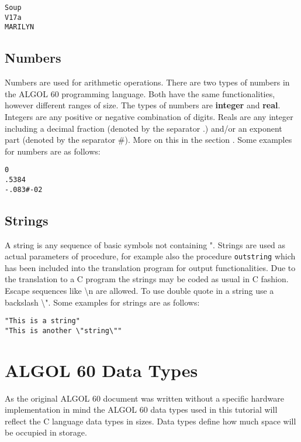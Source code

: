 \documentclass{article}
\begin{document}
\begin{lstlisting}[language={[60]algol}]
Soup
V17a
MARILYN
\end{lstlisting}

\subsection{Numbers} \label{numbers}
Numbers are used for arithmetic operations. There are two types of numbers in the ALGOL 60 programming language. Both have the same functionalities, however different ranges of size. The types of numbers are \textbf{integer} and \textbf{real}. Integers are any positive or negative combination of digits. Reals are any integer including a decimal fraction (denoted by the separator .) and/or an exponent part (denoted by the separator \#). More on this in the section . Some examples for numbers are as follows:\\

\begin{lstlisting}[language={[60]algol}]
0
.5384
-.083#-02
\end{lstlisting}

\subsection{Strings}
A string is any sequence of basic symbols not containing ". Strings are used as actual parameters of procedure, for example also the procedure \texttt{outstring} which has been included into the translation program for output functionalities. Due to the translation to a C program the strings may be coded as usual in C fashion. Escape sequences like \textbackslash n are allowed. To use double quote in a string use a backslash \textbackslash". Some examples for strings are as follows:\\

\begin{lstlisting}[language={[60]algol}]
"This is a string"
"This is another \"string\""
\end{lstlisting}

\newpage

\section{ALGOL 60 Data Types} \label{datatypes}
As the original ALGOL 60 document was written without a specific hardware implementation in mind the ALGOL 60 data types used in this tutorial will reflect the C language data types in sizes. Data types define how much space will be occupied in storage.
\end{document}
